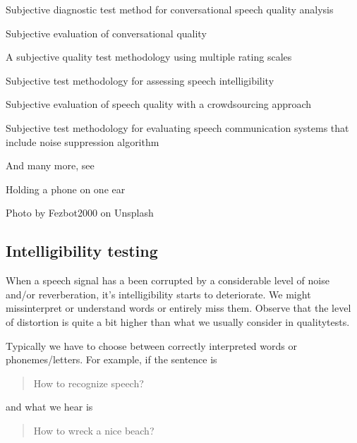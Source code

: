 \documentclass[letterpaper,10pt,english]{jupyterBook}
\begin{document}
\sphinxAtStartPar
{} Subjective diagnostic test method for conversational speech
quality analysis

\sphinxAtStartPar
{} Subjective evaluation of conversational quality

\sphinxAtStartPar
{} A subjective quality test methodology using multiple rating
scales

\sphinxAtStartPar
{} Subjective test methodology for assessing speech
intelligibility

\sphinxAtStartPar
{} Subjective evaluation of speech quality with a crowdsourcing
approach

\sphinxAtStartPar
{} Subjective test methodology for evaluating speech
communication systems that include noise suppression algorithm

\sphinxAtStartPar
And many more, see 

\sphinxAtStartPar
Holding a phone on one ear

\sphinxAtStartPar
{}Photo by
Fezbot2000 on Unsplash


\subsection{Intelligibility testing}
\label{\detokenize{Evaluation/Subjective_quality_evaluation:intelligibility-testing}}
\sphinxAtStartPar
When a speech signal has a been corrupted by a considerable level of
noise and/or reverberation, it’s intelligibility starts to deteriorate.
We might miss\sphinxhyphen{}interpret or \sphinxhyphen{}understand words or entirely miss them.
Observe that the level of distortion is quite a bit higher than what we
usually consider in quality\sphinxhyphen{}tests.

\sphinxAtStartPar
Typically we have to choose between correctly interpreted words or
phonemes/letters. For example, if the sentence is
\begin{quote}

\sphinxAtStartPar
How to recognize speech?
\end{quote}

\sphinxAtStartPar
and what we hear is
\begin{quote}

\sphinxAtStartPar
How to wreck a nice beach?
\end{quote}
\end{document}
